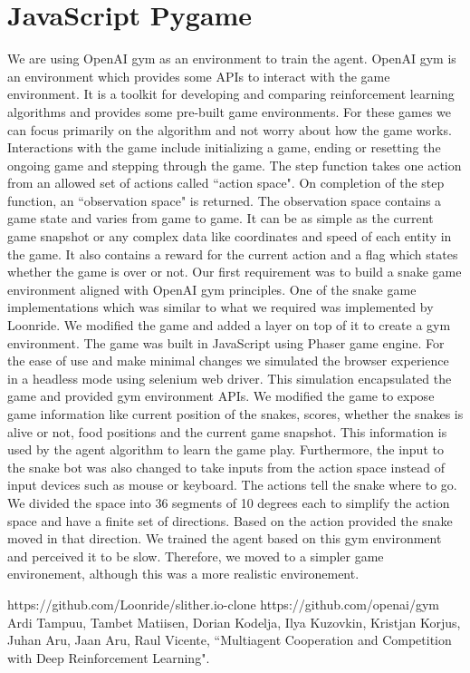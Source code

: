 \documentclass{article}
\begin{document}
\section{JavaScript Pygame}
We are using OpenAI gym\cite{sd2} as an environment to train the agent. OpenAI gym is an environment which provides some APIs to interact with the game environment. It is a toolkit for developing and comparing reinforcement learning algorithms and provides some pre-built game environments. For these games we can focus primarily on the algorithm and not worry about how the game works. Interactions with the game include initializing a game, ending or resetting the ongoing game and stepping through the game. The step function takes one action from an allowed set of actions called ``action space". On completion of the step function, an ``observation space" is returned. The observation space contains a game state and varies from game to game. It can be as simple as the current game snapshot  or any complex data like coordinates and speed of each entity in the game. It also contains a reward for the current action and a flag which states whether the game is over or not.
\break
\break
Our first requirement was to build a snake game environment aligned with OpenAI gym principles. One of the snake game implementations which was similar to what we required was implemented by Loonride\cite{sd1}. We modified the game and added a layer on top of it to create a gym environment. The game was built in JavaScript using Phaser game engine. For the ease of use and make minimal changes we simulated the browser experience in a headless mode using selenium web driver. This simulation encapsulated the game and provided gym environment APIs.
\break
\break
We modified the game to expose game information like current position of the snakes, scores, whether the snakes is alive or not, food positions and the current game snapshot. This information is used by the agent algorithm to learn the game play. Furthermore, the input to the snake bot was also changed to take inputs from the action space instead of input devices such as mouse or keyboard. The actions tell the snake where to go. We divided the space into 36 segments of 10 degrees each to simplify the action space and have a finite set of directions. Based on the action provided the snake moved in that direction.
\break
\break
We trained the agent based on this gym environment and perceived it to be slow. Therefore, we moved to a simpler game environement, although this was a more realistic environement.

\begin{thebibliography}{00}
https://github.com/Loonride/slither.io-clone
https://github.com/openai/gym
Ardi Tampuu, Tambet Matiisen, Dorian Kodelja, Ilya Kuzovkin, Kristjan Korjus, Juhan Aru, Jaan Aru, Raul Vicente, ``Multiagent Cooperation and Competition with Deep Reinforcement Learning".
\end{thebibliography}
\end{document}
